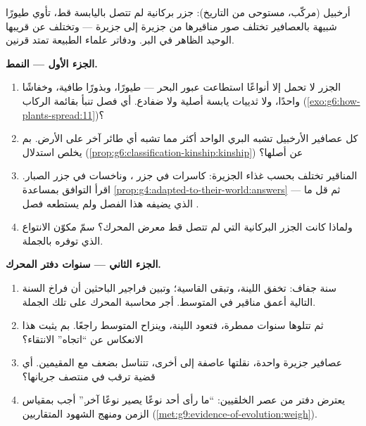 \begin{problem}\label{pb:g9:how-species-change:1}
أرخبيل (مركّب، مستوحى من التاريخ): جزر بركانية لم تتصل
باليابسة قط، تأوي طيورًا شبيهة بالعصافير تختلف صور
مناقيرها من جزيرة إلى جزيرة --- وتختلف عن قريبها الوحيد
الظاهر في البر. ودفاتر علماء الطبيعة تمتد قرنين.

\medskip\noindent\textbf{الجزء الأول --- النمط.}
\begin{enumerate}
  \item الجزر لا تحمل إلا أنواعًا استطاعت عبور البحر ---
        طيورًا، وبذورًا طافية، وخفاشًا واحدًا، ولا
        ثدييات يابسة أصلية ولا ضفادع. أي فصل تنبأ بقائمة
        الركاب (\cref{exo:g6:how-plants-spread:11})؟
  \item كل عصافير الأرخبيل تشبه  البري الواحد أكثر
        مما تشبه أي طائر آخر على الأرض. بم يخلص استدلال
        (\cref{prop:g6:classification-kinship:kinship})
        عن أصلها؟
  \item المناقير تختلف بحسب غذاء الجزيرة: كاسرات  في
        جزر ، وناخسات في جزر الصبار. اقرأ التوافق
        بمساعدة
        \cref{prop:g4:adapted-to-their-world:answers} ---
        ثم قل ما الذي يضيفه هذا الفصل ولم يستطعه فصل
        .
  \item ولماذا كانت الجزر البركانية التي لم تتصل قط معرض
        المحرك؟ سمّ مكوّن الانتواع الذي توفره بالجملة.
\end{enumerate}

\medskip\noindent\textbf{الجزء الثاني --- سنوات دفتر
المحرك.}
\begin{enumerate}[resume]
  \item سنة جفاف: تخفق  اللينة، وتبقى القاسية؛
        وتبين فراجير الباحثين أن فراخ السنة التالية أعمق
        مناقير في المتوسط. أجر محاسبة المحرك على تلك
        الجملة.
  \item ثم تتلوها سنوات ممطرة، فتعود  اللينة،
        وينزاح المتوسط راجعًا. بم يثبت هذا الانعكاس عن
        ``اتجاه'' الانتقاء؟
  \item عصافير جزيرة واحدة، نقلتها عاصفة إلى أخرى،
        تتناسل بضعف مع المقيمين. أي قضية ترقب في منتصف
        جريانها؟
  \item يعترض دفتر من عصر الخلقيين: ``ما رأى أحد نوعًا
        يصير نوعًا آخر.'' أجب بمقياس الزمن ومنهج الشهود
        المتقاربين
        (\cref{met:g9:evidence-of-evolution:weigh}).
\end{enumerate}


\end{problem}

